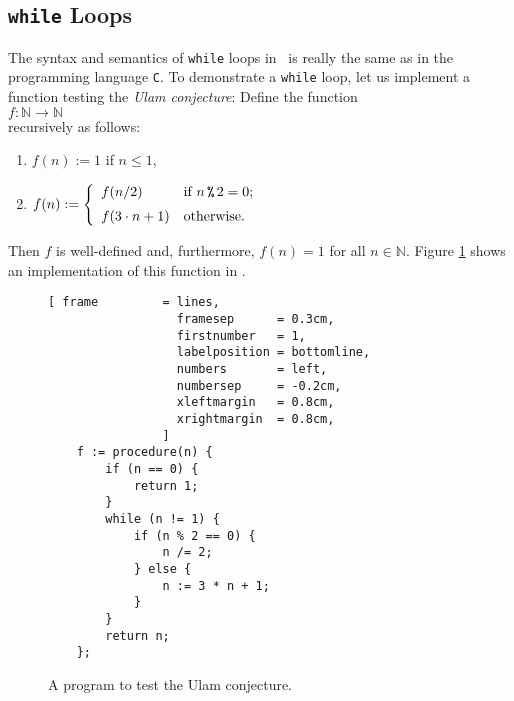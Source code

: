 \subsection{\texttt{while} Loops}
The syntax and semantics of \texttt{while} loops in \setlx\ is really the same as in the programming
language \texttt{C}.  To demonstrate a \texttt{while} loop,
let us implement a function testing the \emph{Ulam conjecture}:  Define the function
\\[0.2cm]
\hspace*{1.3cm}
$f: \mathbb{N} \rightarrow \mathbb{N}$
\\[0.2cm]
recursively as follows:
\begin{enumerate}
\item $f(n) := 1$ if $n \leq 1$,
\item $f(n) := \left\{
       \begin{array}[c]{ll}
         f(n/2)           & \mbox{if $n \,\texttt{\symbol{37}}\, 2 = 0$;} \\[0.2cm]  
         f(3 \cdot n + 1) & \mbox{otherwise.} 
       \end{array}
       \right.
      $ 
\end{enumerate}
Then $f$ is well-defined and, furthermore, $f(n) = 1$ for all $n \in \mathbb{N}$.  Figure
\ref{fig:ulam.stlx} shows an implementation of this function in \setlx.  

\begin{figure}[!ht]
\centering
\begin{Verbatim}[ frame         = lines, 
                  framesep      = 0.3cm, 
                  firstnumber   = 1,
                  labelposition = bottomline,
                  numbers       = left,
                  numbersep     = -0.2cm,
                  xleftmargin   = 0.8cm,
                  xrightmargin  = 0.8cm,
                ]
    f := procedure(n) {
        if (n == 0) {
            return 1;   
        }
        while (n != 1) {
            if (n % 2 == 0) {
                n /= 2;
            } else {
                n := 3 * n + 1;
            }
        }
        return n;
    };
\end{Verbatim}
\vspace*{-0.3cm}
\caption{A program to test the Ulam conjecture.}
\label{fig:ulam.stlx}
\end{figure}


